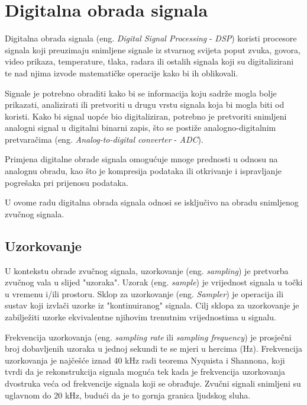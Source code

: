 \documentclass[times, utf8, zavrsni, numeric]{fer}
\begin{document}
%

\chapter{Digitalna obrada signala}
Digitalna obrada signala (eng. \textit{Digital Signal Processing} - \textit{DSP}) koristi procesore signala koji preuzimaju snimljene signale iz stvarnog svijeta poput zvuka, govora, video prikaza, temperature, tlaka, radara ili ostalih signala koji su digitalizirani te nad njima izvode matematičke operacije kako bi ih oblikovali.

Signale je potrebno obraditi kako bi se informacija koju sadrže mogla bolje prikazati, analizirati ili pretvoriti u drugu vrstu signala koja bi mogla biti od koristi. Kako bi signal uopće bio digitaliziran, potrebno je pretvoriti snimljeni analogni signal u digitalni binarni zapis, što se postiže analogno-digitalnim pretvaračima (eng. \textit{Analog-to-digital converter} - \textit{ADC}).

Primjena digitalne obrade signala omogućuje mnoge prednosti u odnosu na analognu obradu, kao što je kompresija podataka ili otkrivanje i ispravljanje pogrešaka pri prijenosu podataka.\cite{broesch2008digital}

U ovome radu digitalna obrada signala odnosi se isključivo na obradu snimljenog zvučnog signala.

\section{Uzorkovanje}
U kontekstu obrade zvučnog signala, uzorkovanje (eng. \textit{sampling}) je pretvorba zvučnog vala u slijed "uzoraka". Uzorak (eng. \textit{sample}) je vrijednost signala u točki u vremenu i/ili prostoru. Sklop za uzorkovanje (eng. \textit{Sampler}) je operacija ili sustav koji izvlači uzorke iz "kontinuiranog" signala. Cilj sklopa za uzorkovanje je zabilježiti uzorke ekvivalentne njihovim trenutnim vrijednostima u signalu. 

Frekvencija uzorkovanja (eng. \textit{sampling rate} ili \textit{sampling frequency}) je prosječni broj dobavljenih uzoraka u jednoj sekundi te se mjeri u hercima (Hz). Frekvencija uzorkovanja je najčešće iznad 40 kHz radi teorema Nyquista i Shannona, koji tvrdi da je rekonstrukcija signala moguća tek kada je frekvencija uzorkovanja dvostruka veća od frekvencije signala koji se obrađuje.\cite{candes2008introduction} Zvučni signali snimljeni su uglavnom do 20 kHz, budući da je to gornja granica ljudskog sluha.
\end{document}
